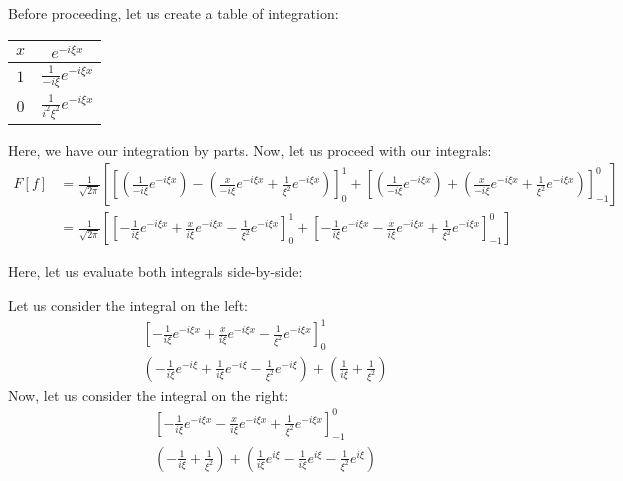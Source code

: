 \begin{enumerate}
Before proceeding, let us create a table of integration:

\begin{center}
  \begin{tabular}{c|c}
    $x$ &  $                    e^{-i \xi x}$\\
    \hline
    $1$ &  $\frac{1}{-i \xi}    e^{-i \xi x}$\\
    \hline
    $0$ &  $\frac{1}{i^2 \xi^2} e^{-i \xi x}$
  \end{tabular}
\end{center}

Here, we have our integration by parts. Now, let us proceed with our integrals:
%
\begin{align}
  F[f]
  & =
  \frac{1}{\sqrt{2 \pi}}
  \left[
    \left[
       \left(\frac{1}{-i \xi} e^{-i \xi x}\right)
     - \left(\frac{x}{- i \xi} e^{-i \xi x} + \frac{1}{\xi^2} e^{-i \xi x}\right)
    \right]^1_0
  + \left[
      \left(\frac{1}{-i \xi} e^{-i \xi x}\right)
    + \left(\frac{x}{- i \xi} e^{-i \xi x} + \frac{1}{\xi^2} e^{-i \xi x}\right)
    \right]^0_{-1}
  \right]\\
  & =
  \frac{1}{\sqrt{2 \pi}}
  \left[
    \left[
     - \frac{1}{ i \xi} e^{-i \xi x}
     + \frac{x}{ i \xi} e^{-i \xi x}
     - \frac{1}{ \xi^2} e^{-i \xi x}
    \right]^1_0
  + \left[
    - \frac{1}{ i \xi} e^{-i \xi x}
    - \frac{x}{ i \xi} e^{-i \xi x}
    + \frac{1}{ \xi^2} e^{-i \xi x}
    \right]^0_{-1}
  \right]
\end{align}

Here, let us evaluate both integrals side-by-side:
\newpage
\begin{multicols}{2}
  Let us consider the integral on the left:
\begin{align}
  &
  \left[
    - \frac{1}{ i \xi} e^{-i \xi x}
    + \frac{x}{ i \xi} e^{-i \xi x}
    - \frac{1}{ \xi^2} e^{-i \xi x}
  \right]^1_0\\
  &
  \left(
    - \frac{1}{ i \xi} e^{-i \xi}
    + \frac{1}{ i \xi} e^{-i \xi}
    - \frac{1}{ \xi^2} e^{-i \xi}
  \right)
  +
  \left(
    \frac{1}{ i \xi}
  + \frac{1}{ \xi^2}
  \right)
\end{align}
  Now, let us consider the integral on the right:
\begin{align}
  &
  \left[
  - \frac{1}{ i \xi} e^{-i \xi x}
  - \frac{x}{ i \xi} e^{-i \xi x}
  + \frac{1}{ \xi^2} e^{-i \xi x}
  \right]^0_{-1}\\
  &
  \left(
  - \frac{1}{ i \xi}
  + \frac{1}{ \xi^2}
  \right)
  +
  \left(
    \frac{1}{ i \xi} e^{i \xi}
  - \frac{1}{ i \xi} e^{i \xi}
  - \frac{1}{ \xi^2} e^{i \xi}
  \right)
\end{align}
\end{multicols}


\end{enumerate}
